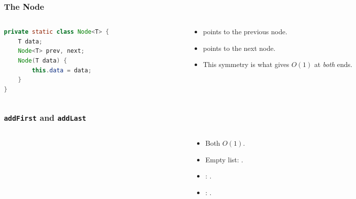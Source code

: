 \documentclass[aspectratio=169,10pt,compress]{beamer}
\begin{document}
\begin{frame}[t,fragile]\frametitle{The Node}
  \begin{columns}[T]
    \begin{column}{0.5\textwidth}
      \begin{lstlisting}[language=Java, basicstyle=\ttfamily\scriptsize, frame=single]
private static class Node<T> {
    T data;
    Node<T> prev, next;
    Node(T data) {
        this.data = data;
    }
}
      \end{lstlisting}
    \end{column}
    \begin{column}{0.46\textwidth}
      \begin{itemize}\small
        \item {} points to the previous node.
        \item {} points to the next node.
        \item This symmetry is what gives $O(1)$ at \emph{both} ends.
      \end{itemize}
    \end{column}
  \end{columns}
\end{frame}

\begin{frame}[t,fragile]\frametitle{\texttt{addFirst} and \texttt{addLast}}
  \begin{columns}[T]
    \begin{column}{0.52\textwidth}
    \end{column}
    \begin{column}{0.44\textwidth}
      \begin{itemize}\small
        \item Both $O(1)$.
        \item Empty list: .
        \item {}: .
        \item {}: .
      \end{itemize}
    \end{column}
  \end{columns}
\end{frame}
\end{document}
